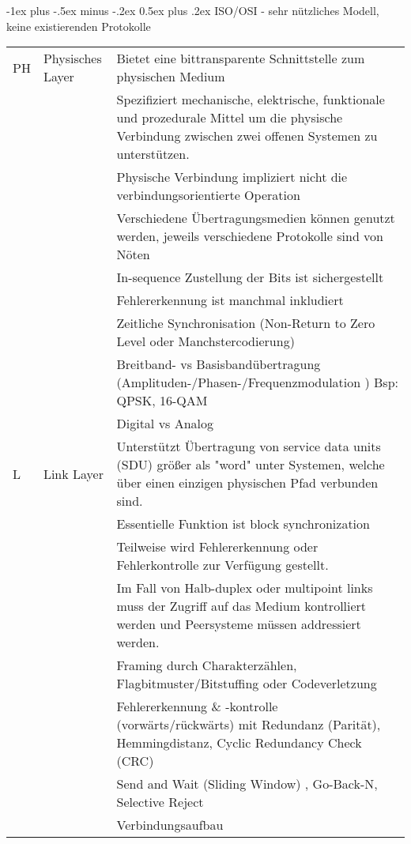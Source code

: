 \documentclass[10pt,landscape]{article}
\makeatletter
\renewcommand{\section}{\@startsection{section}{1}{0mm}%
                                {-1ex plus -.5ex minus -.2ex}%
                                {0.5ex plus .2ex}%
                                {\normalfont\large\bfseries}}
\makeatother
\begin{document}
\section{ISO/OSI - sehr nützliches Modell, keine existierenden Protokolle}
\begin{tabular}{l | l | l}
    PH & Physisches Layer & 
        Bietet eine bittransparente Schnittstelle zum physischen Medium\\
        &&Spezifiziert mechanische, elektrische, funktionale und prozedurale Mittel um die physische Verbindung zwischen zwei offenen Systemen zu unterstützen.\\
        &&Physische Verbindung impliziert nicht die verbindungsorientierte Operation\\
        &&Verschiedene Übertragungsmedien können genutzt werden, jeweils verschiedene Protokolle sind von Nöten\\
        &&In-sequence Zustellung der Bits ist sichergestellt\\
        &&Fehlererkennung ist manchmal inkludiert\\ \hline
        && Zeitliche Synchronisation (Non-Return to Zero Level oder Manchstercodierung)\\
        && Breitband- vs Basisbandübertragung (Amplituden-/Phasen-/Frequenzmodulation ) Bsp: QPSK, 16-QAM  \\
        && Digital vs Analog \\
        \hline
    L & Link Layer & 
        Unterstützt Übertragung von service data units (SDU) größer als "word" unter Systemen, welche über einen einzigen physischen Pfad verbunden sind.\\
        &&Essentielle Funktion ist block synchronization\\
        &&Teilweise wird Fehlererkennung oder Fehlerkontrolle zur Verfügung gestellt.\\
        &&Im Fall von Halb-duplex oder multipoint links muss der Zugriff auf das Medium kontrolliert werden und Peersysteme müssen addressiert werden.\\ \hline
        && Framing durch Charakterzählen, Flagbitmuster/Bitstuffing oder Codeverletzung \\
        && Fehlererkennung \& -kontrolle (vorwärts/rückwärts) mit Redundanz (Parität), Hemmingdistanz, Cyclic Redundancy Check (CRC)\\
        && Send and Wait (Sliding Window) , Go-Back-N, Selective Reject \\
        && Verbindungsaufbau \\

\end{tabular}
\end{document}
